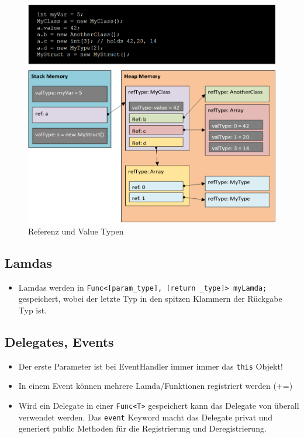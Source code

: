 \begin{figure}[h!]
\centering
\includegraphics[width=0.8\linewidth]{images/reference_value_type}
\caption{Referenz und Value Typen}
\label{fig:valuetypes}
\end{figure}

\clearpage

\subsection{Lamdas}
\begin{itemize}
	\item Lamdas werden in \lstinline|Func<[param_type], [return _type]> myLamda;| gespeichert, wobei der letzte Typ in den spitzen Klammern der Rückgabe Typ ist.
\end{itemize}

\subsection{Delegates, Events}
\begin{itemize}
	\item Der erste Parameter ist bei EventHandler immer immer das \lstinline|this| Objekt!
	\item In einem Event können mehrere Lamda/Funktionen registriert werden (+=)
	\item Wird ein Delegate in einer \lstinline|Func<T>| gespeichert kann das Delegate von überall verwendet werden. Das \lstinline|event| Keyword macht das Delegate privat und generiert public Methoden für die Registrierung und Deregistrierung.
\end{itemize}

